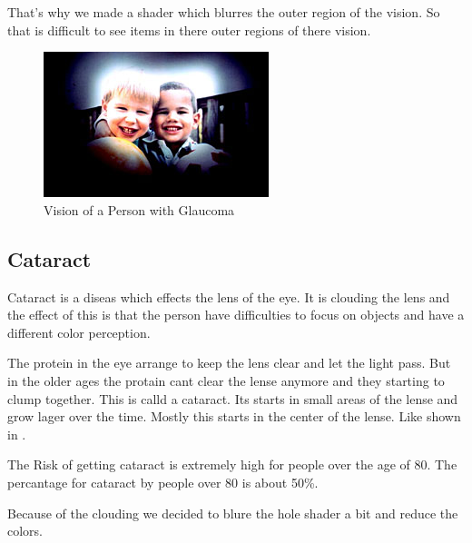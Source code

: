 \documentclass{acm_proc_article-sp}
\begin{document}
That's why we made a shader which blurres the outer region of the vision. So that is difficult to see items in there outer regions of there vision.

\begin{figure}
    \centering
    \includegraphics[width=\columnwidth]{glaucomavision.png}
    \caption{Vision of a Person with Glaucoma}
    \label{fig:glaucoma}
\end{figure}

\subsection{Cataract}

Cataract is a diseas which effects the lens of the eye. It is clouding the lens and the effect of this is that the person have difficulties to focus on objects and have a different color perception.

The protein in the eye arrange to keep the lens clear and let the light pass. But in the older ages the protain cant clear the lense anymore and they starting to clump together. This is calld a cataract. Its starts in small areas of the lense and grow lager over the time. Mostly this starts in the center of the lense. Like shown in .

The Risk of getting cataract is extremely high for people over the age of 80. The percantage for cataract by people over 80 is about 50\%.~\cite{cataractfacts}

Because of the clouding we decided to blure the hole shader a bit and reduce the colors.
\end{document}
